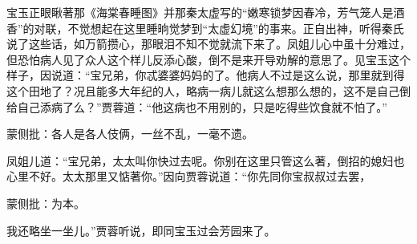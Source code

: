 \begin{parag}
    宝玉正眼瞅著那《海棠春睡图》并那秦太虚写的“嫩寒锁梦因春冷，芳气笼人是酒香”的对联，不觉想起在这里睡晌觉梦到“太虚幻境”的事来。正自出神，听得秦氏说了这些话，如万箭攒心，那眼泪不知不觉就流下来了。凤姐儿心中虽十分难过，但恐怕病人见了众人这个样儿反添心酸，倒不是来开导劝解的意思了。见宝玉这个样子，因说道：“宝兄弟，你忒婆婆妈妈的了。他病人不过是这么说，那里就到得这个田地了？况且能多大年纪的人，略病一病儿就这么想那么想的，这不是自己倒给自己添病了么？”贾蓉道：“他这病也不用别的，只是吃得些饮食就不怕了。”\begin{note}蒙侧批：各人是各人伎俩，一丝不乱，一毫不遗。\end{note}凤姐儿道：“宝兄弟，太太叫你快过去呢。你别在这里只管这么著，倒招的媳妇也心里不好。太太那里又惦著你。”因向贾蓉说道：“你先同你宝叔叔过去罢，\begin{note}蒙侧批：为本。\end{note}我还略坐一坐儿。”贾蓉听说，即同宝玉过会芳园来了。
\end{parag}



